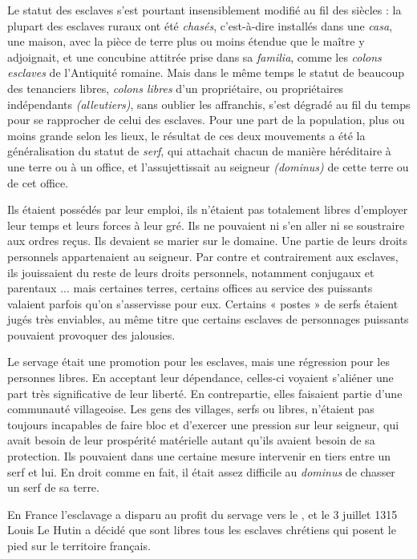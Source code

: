  Le statut des esclaves s'est pourtant insensiblement modifié au fil des siècles : la plupart des esclaves ruraux ont été \emph{chasés}, c'est-à-dire installés dans une \emph{casa}, une maison, avec la pièce de terre plus ou moins étendue que le maître y adjoignait, et une concubine attitrée prise dans sa \emph{familia}, comme les \emph{colons esclaves} de l'Antiquité romaine. Mais dans le même temps le statut de beaucoup des tenanciers libres, \emph{colons libres} d'un propriétaire, ou propriétaires indépendants \emph{(alleutiers)}, sans oublier les affranchis, s'est dégradé au fil du temps pour se rapprocher de celui des esclaves. Pour une part de la population, plus ou moins grande selon les lieux, le résultat de ces deux mouvements a été la généralisation du statut de \emph{serf}, qui attachait chacun de manière héréditaire à une terre ou à un office, et l'assujettissait au seigneur \emph{(dominus)} de cette terre ou de cet office. 

 Ils étaient possédés par leur emploi, ils n'étaient pas totalement libres d'employer leur temps et leurs forces à leur gré. Ils ne pouvaient ni s'en aller ni se soustraire aux ordres reçus. Ils devaient se marier sur le domaine. Une partie de leurs droits personnels appartenaient au seigneur. Par contre et contrairement aux esclaves, ils jouissaient du reste de leurs droits personnels, notamment conjugaux et parentaux ... mais certaines terres, certains offices au service des puissants valaient parfois qu'on s'asservisse pour eux. Certains « postes » de serfs étaient jugés très enviables, au même titre que certains esclaves de personnages puissants pouvaient provoquer des jalousies.

 Le servage était une promotion pour les esclaves, mais une régression pour les personnes libres. En acceptant leur dépendance, celles-ci voyaient s'aliéner une part très significative de leur liberté. En contrepartie, elles faisaient partie d'une communauté villageoise. Les gens des villages, serfs ou libres, n'étaient pas toujours incapables de faire bloc et d'exercer une pression sur leur seigneur, qui avait besoin de leur prospérité matérielle autant qu'ils avaient besoin de sa protection. Ils pouvaient dans une certaine mesure intervenir en tiers entre un serf et lui. En droit comme en fait, il était assez difficile au \emph{dominus} de chasser un serf de sa terre. 
 
 En France l'esclavage a disparu au profit du servage vers le , et le 3 juillet 1315 Louis Le Hutin a décidé que sont libres tous les esclaves chrétiens qui posent le pied sur le territoire français. 

